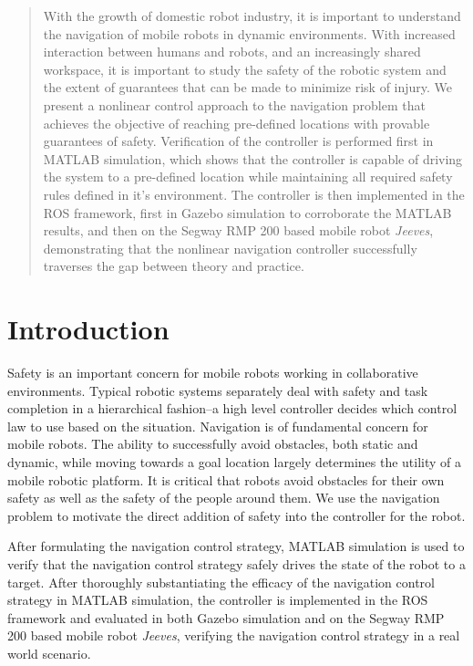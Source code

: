\documentclass[conference]{IEEEtran}
\begin{document}
\begin{abstract}
With the growth of domestic robot industry, it is important to understand the navigation of mobile robots in dynamic environments. With increased interaction between humans and robots, and an increasingly shared workspace, it is important to study the safety of the robotic system and the extent of guarantees that can be made to minimize risk of injury. We present a nonlinear control approach to the navigation problem that achieves the objective of reaching pre-defined locations with provable guarantees of safety. Verification of the controller is performed first in MATLAB simulation, which shows that the controller is capable of driving the system to a pre-defined location while maintaining all required safety rules defined in it's environment. The controller is then implemented in the ROS framework, first in Gazebo simulation to corroborate the MATLAB results, and then on the Segway RMP 200 based mobile robot \textit{Jeeves}, demonstrating that the nonlinear navigation controller successfully traverses the gap between theory and practice. 
\end{abstract}

\IEEEpeerreviewmaketitle

\section{Introduction}
Safety is an important concern for mobile robots working in collaborative environments. Typical robotic systems separately deal with safety and task completion in a hierarchical fashion--a high level controller decides which control law to use based on the situation. Navigation is of fundamental concern for mobile robots. The ability to successfully avoid obstacles, both static and dynamic, while moving towards a goal location largely determines the utility of a mobile robotic platform. It is critical that robots avoid obstacles for their own safety as well as the safety of the people around them. We use the navigation problem to motivate the direct addition of safety into the controller for the robot.

After formulating the navigation control strategy, MATLAB simulation is used to verify that the navigation control strategy safely drives the state of the robot to a target. After thoroughly substantiating the efficacy of the navigation control strategy in MATLAB simulation, the controller is implemented in the ROS framework and evaluated in both Gazebo simulation and on the Segway RMP 200 based mobile robot \textit{Jeeves}, verifying the navigation control strategy in a real world scenario.
\end{document}
